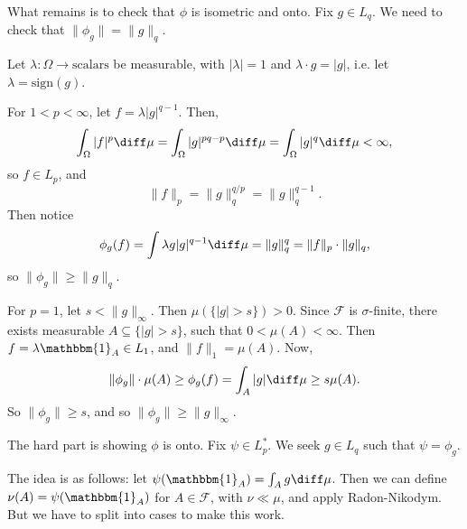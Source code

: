 \documentclass[12pt]{article}
\begin{document}
\begin{proofbox}
	What remains is to check that $\phi$ is isometric and onto. Fix $g \in L_q$. We need to check that $\|\phi_g\| = \|g\|_q$.

	Let $\lambda : \Omega \to \text{scalars}$ be measurable, with $|\lambda| = 1$ and $\lambda \cdot g = |g|$, i.e. let $\lambda = \mathrm{sign}(g)$.

	For $1 < p < \infty$, let $f = \lambda |g|^{q-1}$. Then,
	\[
	\int_{\Omega} |f|^{p} \diff \mu = \int_{\Omega} |g|^{pq - p} \diff \mu = \int_{\Omega} |g|^q \diff \mu < \infty,
	\]
	so $f \in L_p$, and
	\[
	\|f\|_p = \|g\|_q^{q/p} = \|g\|_q^{q-1}.
	\]
	Then notice
	\[
	\phi_g(f) = \int \lambda g |g|^{q-1} \diff \mu = \|g\|_q^{q} = \|f\|_p \cdot \|g\|_q,
	\]
	so $\|\phi_g\| \geq \|g\|_q$.

	For $p = 1$, let $s < \|g\|_\infty$. Then $\mu(\{|g| > s\}) > 0$. Since $\mathcal{F}$ is $\sigma$-finite, there exists measurable $A \subseteq \{|g| > s\}$, such that $0 < \mu(A) < \infty$. Then $f = \lambda \mathbbm{1}_{A} \in L_1$, and $\|f\|_1 = \mu(A)$. Now,
	\[
	\|\phi_g\| \cdot \mu(A) \geq \phi_g(f) = \int_A |g| \diff \mu \geq s \mu(A).
	\]
	So $\|\phi_g\| \geq s$, and so $\|\phi_g\| \geq \|g\|_{\infty}$.

	The hard part is showing $\phi$ is onto. Fix $\psi \in L_p^\ast$. We seek $g \in L_q$ such that $\psi = \phi_g$.

	The idea is as follows: let $\psi(\mathbbm{1}_{A}) = \int_A g \diff \mu$. Then we can define $\nu(A) = \psi(\mathbbm{1}_{A})$ for $A \in \mathcal{F}$, with $\nu \ll \mu$, and apply Radon-Nikodym. But we have to split into cases to make this work.


\end{proofbox}
\end{document}

